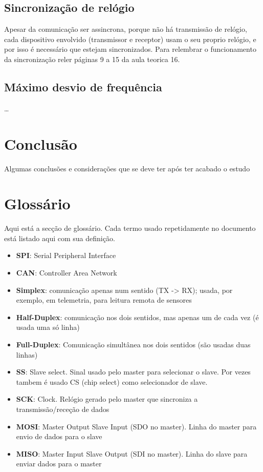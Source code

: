 \documentclass[a4paper, 12pt, onecolumn, oneside]{scrartcl}
\begin{document}
\subsection{Sincronização de relógio}
Apesar da comunicação ser assincrona, porque não há transmissão de relógio, cada dispositivo envolvido (transmissor e receptor) usam o seu proprio relógio, e por isso é necessário que 
estejam sincronizados.
Para relembrar o funcionamento da sincronização reler páginas 9 a 15 da aula teorica 16.

\subsection{Máximo desvio de frequência}
\dots

\section{Conclusão}
Algumas conclusões e considerações que se deve ter após
ter acabado o estudo

\clearpage
\section{Glossário}\label{glossary}

Aqui está a secção de glossário. Cada termo usado repetidamente no documento está listado aqui com sua definição.

\begin{itemize}
    \item\label{spi} \textbf{SPI}: Serial Peripheral Interface
    \item\label{can} \textbf{CAN}: Controller Area Network
    \item\label{simplex} \textbf{Simplex}: comunicação apenas num sentido (TX -> RX); usada, por
    exemplo, em telemetria, para leitura remota de sensores
    \item\label{halfduplex} \textbf{Half-Duplex}: comunicação nos dois sentidos, mas apenas um de
    cada vez (é usada uma só linha)
    \item\label{fullduplex} \textbf{Full-Duplex}: Comunicação simultânea nos dois sentidos (são
    usadas duas linhas)
    \item\label{ss} \textbf{SS}: Slave select. Sinal usado pelo master para selecionar o slave. Por vezes
    tambem é usado CS (chip select) como selecionador de slave.
    \item\label{sck} \textbf{SCK}: Clock. Relógio gerado pelo master que sincroniza a transmissão/receção de dados
    \item\label{mosi} \textbf{MOSI}: Master Output Slave Input (SDO no master).
    Linha do master para envio de dados para o slave
    \item\label{miso} \textbf{MISO}: Master Input Slave Output (SDI no master).
    Linha do slave para enviar dados para o master
\end{itemize}
\end{document}
